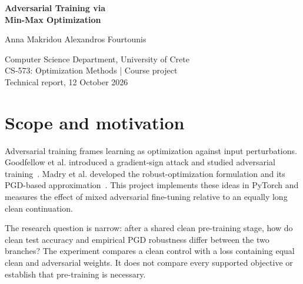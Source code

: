 \documentclass[10pt,a4paper]{article}
\newcommand{\eps}{\varepsilon}
\begin{document}
\begin{center}
{\LARGE\bfseries Adversarial Training via\\[3pt] Min-Max Optimization\par}
\vspace{8pt}
{\large Anna Makridou \quad Alexandros Fourtounis\par}
Computer Science Department, University of Crete\\
CS-573: Optimization Methods \quad | \quad Course project\\
Technical report, 12 October 2026
\end{center}
\vspace{3pt}
\begin{abstract}
We compare clean continuation and mixed adversarial fine-tuning of a convolutional
classifier on CIFAR-10. Both branches start from the same clean pre-training
checkpoint and receive the same number of optimizer updates. Images remain in
pixel space during attack generation, and validation data select the checkpoints.
On all 10,000 test images, PGD-20 with five random restarts at $\eps=4/255$ yields
35.82\% robust accuracy for the adversarial branch and 1.14\% for the clean control.
Clean accuracy decreases from 78.70\% to 70.59\%. The comparison therefore shows a
measured accuracy--robustness tradeoff for this protocol. Results cover one seed
and four perturbation budgets; they do not establish statistical significance,
optimal hyperparameters, or robustness beyond the evaluated attacks.
\end{abstract}

\section{Scope and motivation}
Adversarial training frames learning as optimization against input perturbations.
Goodfellow et al. introduced a gradient-sign attack and studied adversarial
training~\cite{goodfellow}. Madry et al. developed the robust-optimization
formulation and its PGD-based approximation~\cite{madry}. This project implements
these ideas in PyTorch and measures the effect of mixed adversarial fine-tuning
relative to an equally long clean continuation.

The research question is narrow: after a shared clean pre-training stage, how do
clean test accuracy and empirical PGD robustness differ between the two branches?
The experiment compares a clean control with a loss containing equal clean and
adversarial weights. It does not compare every supported objective or establish
that pre-training is necessary.
\end{document}
